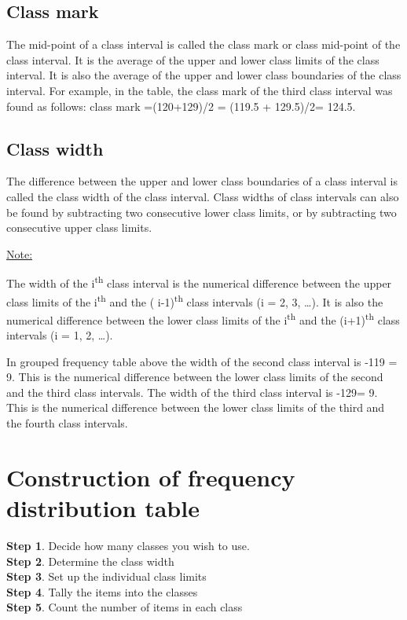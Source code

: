\documentclass[
]{book}
\begin{document}
\hypertarget{class-mark}{%
\subsection{Class mark}\label{class-mark}}

The mid-point of a class interval is called the class mark or class
mid-point of the class interval. It is the average of the upper and
lower class limits of the class interval. It is also the average of the
upper and lower class boundaries of the class interval. For example, in
the table, the class mark of the third class interval was found as
follows: class mark =(120+129)/2 = (119.5 + 129.5)/2= 124.5.

\hypertarget{class-width}{%
\subsection{Class width}\label{class-width}}

The difference between the upper and lower class boundaries of a class
interval is called the class width of the class interval. Class widths
of class intervals can also be found by subtracting two consecutive
lower class limits, or by subtracting two consecutive upper class
limits.

\ul{Note:}

The width of the i\textsuperscript{th} class interval is the numerical difference
between the upper class limits of the i\textsuperscript{th} and the ( i-1)\textsuperscript{th} class
intervals (i = 2, 3, \ldots). It is also the numerical difference between
the lower class limits of the i\textsuperscript{th} and the (i+1)\textsuperscript{th} class intervals (i
= 1, 2, \ldots).

In grouped frequency table above the width of the second class interval
is -119\textbar{} = 9. This is the numerical difference between the lower
class limits of the second and the third class intervals. The width of
the third class interval is -129\textbar= 9. This is the numerical
difference between the lower class limits of the third and the fourth class intervals.

\hypertarget{construction-of-frequency-distribution-table}{%
\section{Construction of frequency distribution table}\label{construction-of-frequency-distribution-table}}

\textbf{Step 1}. Decide how many classes you wish to use.\\
\textbf{Step 2}. Determine the class width\\
\textbf{Step 3}. Set up the individual class limits\\
\textbf{Step 4}. Tally the items into the classes\\
\textbf{Step 5}. Count the number of items in each class
\end{document}

